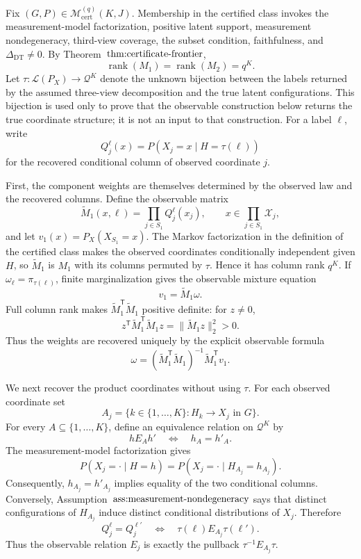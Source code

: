 Fix \((G,P)\in\mathcal M_{\mathrm{cert}}^{(q)}(K,J)\).  Membership in the certified class invokes the measurement-model factorization, positive latent support, measurement nondegeneracy, third-view coverage, the subset condition, faithfulness, and \(\Delta_{\mathrm{DT}}\ne0\).  By Theorem~\(\textnormal{thm:certificate-frontier}\),
\[
 \operatorname{rank}(M_1)=\operatorname{rank}(M_2)=q^K.
\]
Let \(\tau:\mathscr L(P_X)\to\mathcal Q^K\) denote the unknown bijection between the labels returned by the assumed three-view decomposition and the true latent configurations.  This bijection is used only to prove that the observable construction below returns the true coordinate structure; it is not an input to that construction.  For a label \(\ell\), write
\[
 Q_j^\ell(x)=P\!\left(X_j=x\mid H=\tau(\ell)\right)
\]
for the recovered conditional column of observed coordinate \(j\).

First, the component weights are themselves determined by the observed law and the recovered columns.  Define the observable matrix
\[
 \widetilde M_1(x,\ell)=\prod_{j\in S_1}Q_j^\ell(x_j),
 \qquad x\in\prod_{j\in S_1}\mathcal X_j,
\]
and let \(v_1(x)=P_X(X_{S_1}=x)\).  The Markov factorization in the definition of the certified class makes the observed coordinates conditionally independent given \(H\), so \(\widetilde M_1\) is \(M_1\) with its columns permuted by \(\tau\).  Hence it has column rank \(q^K\).  If \(\omega_\ell=\pi_{\tau(\ell)}\), finite marginalization gives the observable mixture equation
\[
 v_1=\widetilde M_1\omega.
\]
Full column rank makes \(\widetilde M_1^{\mathsf T}\widetilde M_1\) positive definite: for \(z\ne0\),
\[
 z^{\mathsf T}\widetilde M_1^{\mathsf T}\widetilde M_1z
 =\lVert\widetilde M_1z\rVert_2^2>0.
\]
Thus the weights are recovered uniquely by the explicit observable formula
\[
 \omega
 =\left(\widetilde M_1^{\mathsf T}\widetilde M_1\right)^{-1}
   \widetilde M_1^{\mathsf T}v_1.
\]

We next recover the product coordinates without using \(\tau\).  For each observed coordinate set
\[
 A_j=\{k\in\{1,\ldots,K\}:H_k\to X_j\text{ in }G\}.
\]
For every \(A\subseteq\{1,\ldots,K\}\), define an equivalence relation on \(\mathcal Q^K\) by
\[
 h\mathrel{E_A}h'
 \quad\Longleftrightarrow\quad h_A=h'_A.
\]
The measurement-model factorization gives
\[
 P(X_j=\mathord\cdot\mid H=h)
 =P(X_j=\mathord\cdot\mid H_{A_j}=h_{A_j}).
\]
Consequently, \(h_{A_j}=h'_{A_j}\) implies equality of the two conditional columns.  Conversely, Assumption~\(\textnormal{ass:measurement-nondegeneracy}\) says that distinct configurations of \(H_{A_j}\) induce distinct conditional distributions of \(X_j\).  Therefore
\[
 Q_j^\ell=Q_j^{\ell'}
 \quad\Longleftrightarrow\quad
 \tau(\ell)\mathrel{E_{A_j}}\tau(\ell').
\]
Thus the observable relation \(E_j\) is exactly the pullback \(\tau^{-1}E_{A_j}\tau\).

